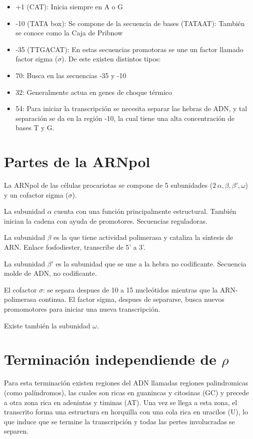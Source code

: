 \begin{itemize}
    \item +1 (CAT): Inicia siempre en A o G
    \item -10 (TATA box): Se compone de la secuencia de bases (TATAAT): También se conoce como la Caja de Pribnow
    \item -35 (TTGACAT): En estas secuencias promotoras se une un factor llamado factor sigma ($\sigma$). De este existen distintos tipos:
    \item 70: Busca en las secuencias -35 y -10
    \item 32: Generalmente actua en genes de choque térmico
    \item 54: Para iniciar la transcripción se necesita separar las hebras de ADN, y tal separación se da en la región -10, la cual tiene una alta concentración de bases T y G.
\end{itemize}

\section{Partes de la ARNpol}

La ARNpol de las células procariotas se compone de 5 subunidades ($2 \ \alpha, \beta , \beta ', \omega$) y un cofactor sigma ($\sigma$).

La subunidad $\alpha$ cuenta con una función principalmente estructural. También inician la cadena con ayuda de promotores. Secuencias reguladoras.

La subunidad $\beta$ es la que tiene actividad polimerasa y cataliza la síntesis de ARN. Enlace fosfodiester, transcribe de 5' a 3'.

La subunidad $\beta '$ es la subunidad que se une a la hebra no codificante. Secuencia molde de ADN, no codificante.

El cofactor $\sigma$: se separa despues de 10 a 15 nucleótidos mientras que la ARN-polimerasa continua. El factor sigma, despues de separarse, busca nuevos promomotores para iniciar una nueva transcripción.

Existe también la subunidad $\omega$.

\section{Terminación independiende de $\rho$}

Para esta terminación existen regiones del ADN llamadas regiones palindromicas (como palíndromos), las cuales son ricas en guanincas y citosinas (GC) y precede a otra zona rica en adenintas y timinas (AT).
Una vez se llega a esta zona, el transcrito forma una estructura en horquilla con una cola rica en uracilos (U), lo que induce que se termine la transcripción y todas las pertes involucradas se separen.

